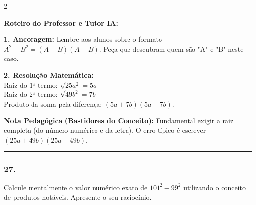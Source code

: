 \begin{multicols*}{2}
\ifgabarito
    \begin{tcolorbox}[colback=CorTitUm!5, colframe=CorTitUm, boxrule=1pt, arc=4pt, left=6pt, right=6pt, top=6pt, bottom=6pt]
    \small\textbf{\textcolor{CorTitUm}{Roteiro do Professor e Tutor IA:}}\par\vspace{0.1cm}
    \color{CinzaEscuro}
    \textbf{1. Ancoragem:} Lembre aos alunos sobre o formato $A^2 - B^2 = (A + B)(A - B)$. Peça que descubram quem são "A" e "B" neste caso.\par\vspace{0.1cm}
    \textbf{2. Resolução Matemática:}\\
    Raiz do 1º termo: $\sqrt{25a^2} = 5a$\\
    Raiz do 2º termo: $\sqrt{49b^2} = 7b$\\
    Produto da soma pela diferença: $(5a + 7b)(5a - 7b)$.
    \end{tcolorbox}
    \vspace{0.15cm}
    
    \begin{boxexplicacao}
    \textbf{Nota Pedagógica (Bastidores do Conceito):} Fundamental exigir a raiz completa (do número numérico e da letra). O erro típico é escrever $(25a + 49b)(25a - 49b)$.
    \end{boxexplicacao}
\fi

\par\vspace{\espacoQuestao}

\noindent\textcolor{CorLinha}{\rule{\linewidth}{0.5pt}} 
\par\vspace{\espacoPreQuestao}
\subsubsection*{27.} 
\begin{enunciadoLiteral}
Calcule mentalmente o valor numérico exato de $101^2 - 99^2$ utilizando o conceito de produtos notáveis. Apresente o seu raciocínio.
\end{enunciadoLiteral}


\end{multicols*}
